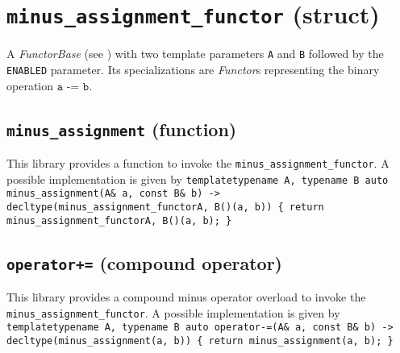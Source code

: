 %
%
%
%
%
%
%

\section{\texttt{minus\_assignment\_functor} (struct)}
A \textit{FunctorBase} (see \cite{functors}) with two template parameters \texttt{A} and \texttt{B} followed by the \texttt{ENABLED} parameter.
Its specializations are \textit{Functor}s representing the binary operation $\texttt{a -= b}$.

\subsection{\texttt{minus\_assignment} (function)}
This library provides a function to invoke the \texttt{minus\_assignment\_functor}.
A possible implementation is given by\newline
\texttt{template\textlangle typename A, typename B\textrangle\newline
auto\newline
minus\_assignment(A\& a, const B\& b)\newline
-> decltype(minus\_assignment\_functor\textlangle A, B\textrangle()(a, b))\newline
\{ return minus\_assignment\_functor\textlangle A, B\textrangle()(a, b); \}}

\subsection{\texttt{operator+=} (compound operator)}
This library provides a compound minus operator overload to invoke the \texttt{minus\_assignment\_functor}.
A possible implementation is given by\newline
\texttt{template\textlangle typename A, typename B\textrangle\newline
auto\newline
operator-=(A\& a, const B\& b)\newline
-> decltype(minus\_assignment(a, b))\newline
\{ return minus\_assignment(a, b); \}}
